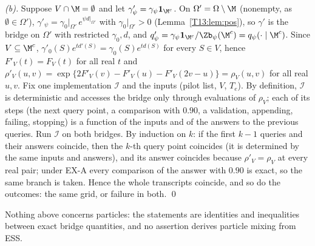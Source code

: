 \documentclass[11pt]{report}
\begin{document}
\emph{(b).} Suppose $V\cap\M=\emptyset$ and let $\gamma'_\psi=\gamma_\psi\mathbf 1_{\M^c}$. On $\Omega'=\Omega\setminus\M$ (nonempty, as $\emptyset\in\Omega'$), $\gamma'_\psi=\gamma_0|_{\Omega'}\,e^{\psi d|_{\Omega'}}$ with $\gamma_0|_{\Omega'}>0$ (Lemma~\ref{T13:lem:pos}), so $\gamma'$ is the bridge on $\Omega'$ with restricted $\gamma_0,d$, and $q'_\psi=\gamma_\psi\mathbf 1_{\M^c}/\Zb_\psi(\M^c)=q_\psi(\cdot\mid\M^c)$. Since $V\subseteq\M^c$, $\gamma'_0(S)e^{td'(S)}=\gamma_0(S)e^{td(S)}$ for every $S\in V$, hence $F'_V(t)=F_V(t)$ for all real $t$ and $\rho'_V(u,v)=\exp\{2F'_V(v)-F'_V(u)-F'_V(2v-u)\}=\rho_V(u,v)$ for all real $u,v$.
Fix one implementation $\mathcal I$ and the inputs (pilot list, $V$, $T_e$). By definition, $\mathcal I$ is deterministic and accesses the bridge only through evaluations of $\rho_V$; each of its steps (the next query point, a comparison with $0.90$, a validation, appending, failing, stopping) is a function of the inputs and of the answers to the previous queries. Run $\mathcal I$ on both bridges. By induction on $k$: if the first $k-1$ queries and their answers coincide, then the $k$-th query point coincides (it is determined by the same inputs and answers), and its answer coincides because $\rho'_V=\rho_V$ at every real pair; under EX-A every comparison of the answer with $0.90$ is exact, so the same branch is taken. Hence the whole transcripts coincide, and so do the outcomes: the same grid, or failure in both. \qed

\begin{T13remark}
Nothing above concerns particles: the statements are identities and inequalities between exact bridge quantities, and no assertion derives particle mixing from ESS.
\end{T13remark}

\appendix
\end{document}
